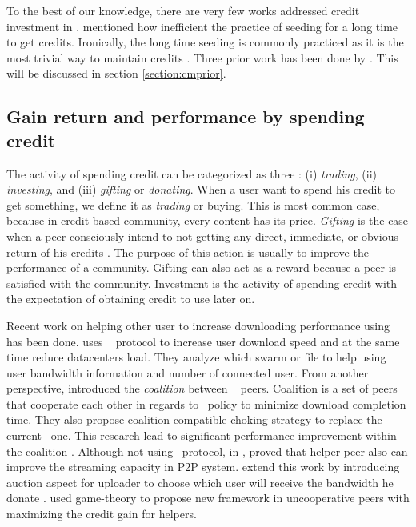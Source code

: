 To the best of our knowledge, there are very few works addressed credit investment in \bt. \citeauthor{2013:survivepriv:jia} mentioned how inefficient the practice of seeding for a long time to get credits. Ironically, the long time seeding is commonly practiced as it is the most trivial way to maintain credits \cite{2013:survivepriv:jia}. Three prior work has been done by \citeauthor{2015:creditmining:capota} \cite{2015:creditmining:capota, 2013:investmentcm:capota, 2014:bwmarket:capota}. This will be discussed in section \ref{section:cmprior}. 

\subsection{Gain return and performance by spending credit}
The activity of spending credit can be categorized as three : (i) \textit{trading}, (ii) \textit{investing}, and (iii) \textit{gifting} or \textit{donating}. When a user want to spend his credit to get something, we define it as \textit{trading} or buying. This is most common case, because in credit-based community, every content has its price. \textit{Gifting} is the case when a peer consciously intend to not getting any direct, immediate, or obvious return of his credits \cite{2006:gifting:ripeanu}. The purpose of this action is usually to improve the performance of a community. Gifting can also act as a reward because a peer is satisfied with the community. Investment is the activity of spending credit with the expectation of obtaining credit to use later on. 

Recent work on helping other user to increase downloading performance using \bt~ has been done. \citeauthor{2014:cloudseed:leon} uses \bt~ protocol to increase user download speed and at the same time reduce datacenters load. They analyze which swarm or file to help using user bandwidth information and number of connected user\cite{2014:cloudseed:leon}. From another perspective, \citeauthor{2015:coalitionbt:zhang} introduced the \textit{coalition} between \bt~ peers. Coalition is a set of peers that cooperate each other in regards to \bt~policy to minimize download completion time. They also propose coalition-compatible choking strategy to replace the current \bt~one. This research lead to significant performance improvement within the coalition \cite{2015:coalitionbt:zhang}. Although not using \bt~protocol, in \citeyear{2009:p2phelp:he}, \citeauthor{2009:p2phelp:he} proved that helper peer also can improve the streaming capacity in P2P system\cite{2009:p2phelp:he}. \citeauthor{2016:gameauctionp2pstream:mostafavi} extend this work by introducing auction aspect for uploader to choose which user will receive the bandwidth he donate \cite{2016:gameauctionp2pstream:mostafavi}. \citeauthor{2016:gameauctionp2pstream:mostafavi} used game-theory to propose new framework in uncooperative peers with maximizing the credit gain for helpers.

